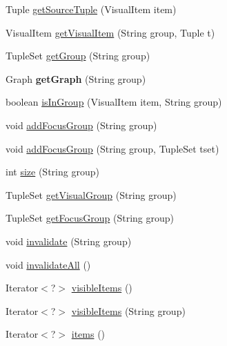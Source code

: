 \begin{DoxyCompactItemize}
\item 
\-Tuple \hyperlink{classprefuse_1_1_visualization_adc8bb6078f3a86a5739ee1532498dd34}{get\-Source\-Tuple} (\-Visual\-Item item)
\item 
\-Visual\-Item \hyperlink{classprefuse_1_1_visualization_a679467253af90126faf0e4542c8f8fac}{get\-Visual\-Item} (\-String group, \-Tuple t)
\item 
\-Tuple\-Set \hyperlink{classprefuse_1_1_visualization_a4248f9de3889ea8a6f42cdcc8f05d1f8}{get\-Group} (\-String group)
\item 
\hypertarget{classprefuse_1_1_visualization_a55d92dfe2430ae3c043afd0c350a1f1f}{\-Graph {\bfseries get\-Graph} (\-String group)}\label{classprefuse_1_1_visualization_a55d92dfe2430ae3c043afd0c350a1f1f}

\item 
boolean \hyperlink{classprefuse_1_1_visualization_aabf1192748054a449d805ef44043d081}{is\-In\-Group} (\-Visual\-Item item, \-String group)
\item 
void \hyperlink{classprefuse_1_1_visualization_ad019c5231c7486c03521f658c33b0784}{add\-Focus\-Group} (\-String group)
\item 
void \hyperlink{classprefuse_1_1_visualization_a7b40cc082735d87a606123570a33f78e}{add\-Focus\-Group} (\-String group, \-Tuple\-Set tset)
\item 
int \hyperlink{classprefuse_1_1_visualization_a57ab6fd894c7c63528bd1dead1a19956}{size} (\-String group)
\item 
\-Tuple\-Set \hyperlink{classprefuse_1_1_visualization_a32987f22992fc2b9969d24411e40dd0f}{get\-Visual\-Group} (\-String group)
\item 
\-Tuple\-Set \hyperlink{classprefuse_1_1_visualization_a82c909613dd736eece079928190f1673}{get\-Focus\-Group} (\-String group)
\item 
void \hyperlink{classprefuse_1_1_visualization_aef209f4870df924027da10535e2489cd}{invalidate} (\-String group)
\item 
void \hyperlink{classprefuse_1_1_visualization_aa70803151c42cbaa315d039ef03029c4}{invalidate\-All} ()
\item 
\-Iterator$<$?$>$ \hyperlink{classprefuse_1_1_visualization_a5fc7d32d717504042c7b5ee45c41b739}{visible\-Items} ()
\item 
\-Iterator$<$?$>$ \hyperlink{classprefuse_1_1_visualization_ab677bab25bb9e7d46909c9de3d8b47e4}{visible\-Items} (\-String group)
\item 
\-Iterator$<$?$>$ \hyperlink{classprefuse_1_1_visualization_a629a8a531883c3329d2cab70e8ad7e06}{items} ()

\end{DoxyCompactItemize}
